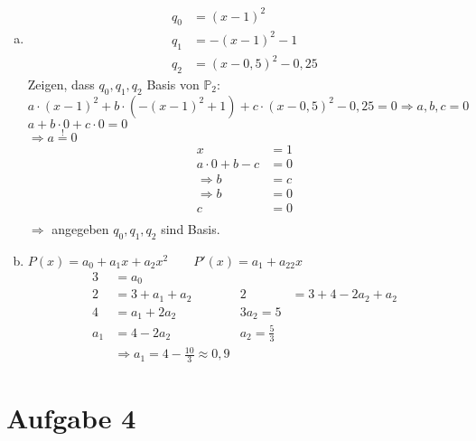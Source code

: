 \documentclass[11pt,a4paper]{article}
\newcommand{\Aufgabe}[1]{\section*{Aufgabe #1}}
\begin{document}
      \begin{enumerate}[a)]
        \item
        \begin{align*}
            q_0&=(x-1)^2\\
            q_1&=-(x-1)^2-1\\
            q_2&=(x-0,5)^2-0,25
        \end{align*}
        Zeigen, dass $q_0,q_1,q_2$ Basis von $\mathbb{P}_2$:\\
        $a\cdot(x-1)^2+b\cdot\left(-(x-1)^2+1\right)+c\cdot(x-0,5)^2-0,25=0\Rightarrow a,b,c=0$\\
        $a+b\cdot 0+c\cdot 0=0$\\
        $\Rightarrow a\stackrel{!}{=}0$\\
        \begin{align*}
          x&=1\\
          a\cdot 0+b-c&=0\\
          \Rightarrow b&=c\\
          \Rightarrow b&=0\\
          c&=0\\
        \end{align*}
        $\Rightarrow$ angegeben $q_0,q_1,q_2$ sind Basis.
        \item
        $P(x)=a_0+a_1x+a_2x^2\qquad P'(x)=a_1+a_22x$
        \begin{align*}
          3&=a_0\\
          2&=3+a_1+a_2 & 2&=3+4-2a_2+a_2\\
          4&=a_1+2a_2 & 3a_2=5\\
          a_1&=4-2a_2 & a_2=\frac{5}{3}\\
          &\Rightarrow a_1=4-\frac{10}{3}\approx 0,9
        \end{align*}
      \end{enumerate}
      \newpage

      \Aufgabe{4}
\end{document}
